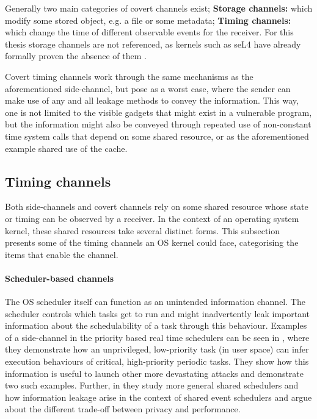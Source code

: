 Generally two main categories of covert channels exist; \textbf{Storage
channels:} which modify some stored object, e.g. a file or some metadata;
\textbf{Timing channels:} which change the time of different observable events
for the receiver. For this thesis storage channels are not referenced, as
kernels such as seL4 have already formally proven the absence of them
\cite{murray2013}.

Covert timing channels work through the same mechanisms as the aforementioned
side-channel, but pose as a worst case, where the sender can make use of any
and all leakage methods to convey the information. This way, one is not limited
to the visible gadgets that might exist in a vulnerable program, but the
information might also be conveyed through repeated use of non-constant time
system calls that depend on some shared resource, or as the aforementioned
example shared use of the cache.

\subsection{Timing channels}\label{sub:timing_channels}
Both side-channels and covert channels rely on some shared resource whose state
or timing can be observed by a receiver. In the context of an operating system
kernel, these shared resources take several distinct forms. This subsection
presents some of the timing channels an OS kernel could face, categorising the
items that enable the channel.

\paragraph{Scheduler-based channels} The OS scheduler itself can function as an
unintended information channel. The scheduler controls which tasks get to run
and might inadvertently leak important information about the schedulability of
a task through this behaviour. Examples of a side-channel in the priority based
real time schedulers can be seen in \cite{chen2019}, where they demonstrate how
an unprivileged, low-priority task (in user space) can infer execution
behaviours of critical, high-priority periodic tasks. They show how this
information is useful to launch other more devastating attacks and demonstrate
two such examples. Further, in \cite{kadloor2016} they study more general
shared schedulers and how information leakage arise in the context of shared
event schedulers and argue about the different trade-off between privacy and
performance.

